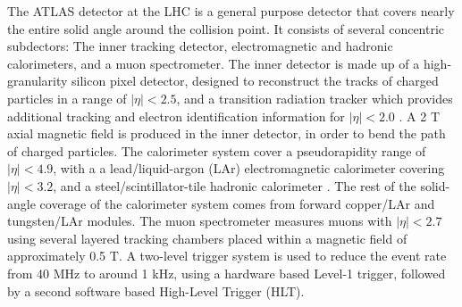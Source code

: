 The ATLAS detector \cite{PERF-2007-01} at the LHC is a general purpose detector that covers nearly the entire solid angle around the collision point. It consists of several concentric subdectors: The inner tracking detector, electromagnetic and hadronic calorimeters, and a muon spectrometer. The inner detector is made up of a high-granularity silicon pixel detector, designed to reconstruct the tracks of charged particles in a range of $|\eta|< 2.5$, and a transition radiation tracker which provides additional tracking and electron identification information for $|\eta|< 2.0$ \cite{IDET-2010-01}. A 2 T axial magnetic field is produced in the inner detector, in order to bend the path of charged particles. The calorimeter system cover a pseudorapidity range of $|\eta|< 4.9$, with a a lead/liquid-argon (LAr) electromagnetic calorimeter covering $|\eta|< 3.2$, and a steel/scintillator-tile hadronic calorimeter \cite{LARG-2009-01}. The rest of the solid-angle coverage of the calorimeter system comes from forward copper/LAr and tungsten/LAr modules. The muon spectrometer measures muons with $|\eta|< 2.7$ using several layered tracking chambers placed within a magnetic field of approximately 0.5 T. A two-level trigger system \cite{PERF-2011-02} is used to reduce the event rate from 40 MHz to around 1 kHz, using a hardware based Level-1 trigger, followed by a second software based High-Level Trigger (HLT).
